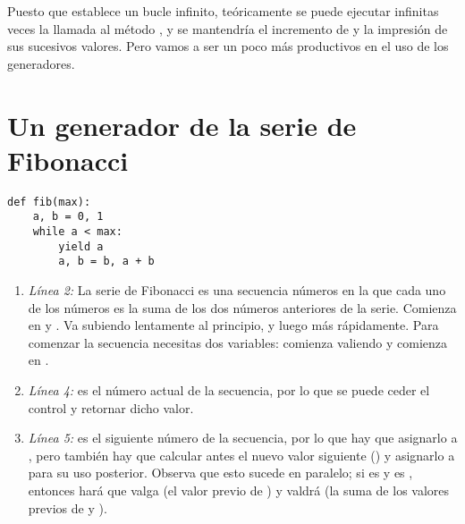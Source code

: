 Puesto que  establece un bucle infinito, teóricamente se puede ejecutar infinitas veces la llamada al método , y se mantendría el incremento de  y la impresión de sus sucesivos valores. Pero vamos a ser un poco más productivos en el uso de los generadores.

\section{Un generador de la serie de Fibonacci}


\noindent\begin{minipage}{\textwidth}
\begin{lstlisting}[mathescape=True]
def fib(max):
    a, b = 0, 1
    while a < max:
        yield a
        a, b = b, a + b
\end{lstlisting}
\end{minipage}

\begin{enumerate}

\item \emph{Línea 2:} La serie de Fibonacci es una secuencia números en la que cada uno de los números es la suma de los dos números anteriores de la serie. Comienza en  y . Va subiendo lentamente al principio, y luego más rápidamente. Para comenzar la secuencia necesitas dos variables:  comienza valiendo  y  comienza en .

\item \emph{Línea 4:}  es el número actual de la secuencia, por lo que se puede ceder el control y retornar dicho valor.

\item \emph{Línea 5:}  es el siguiente número de la secuencia, por lo que hay que asignarlo a , pero también hay que calcular antes el nuevo valor siguiente () y asignarlo a  para su uso posterior. Observa que esto sucede en paralelo; si  es  y  es , entonces  hará que  valga  (el valor previo de ) y  valdrá  (la suma de los valores previos de  y ).

\end{enumerate}

